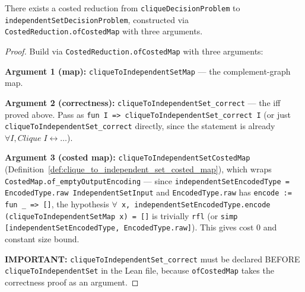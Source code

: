 \begin{theorem}
  \label{thm:clique_to_independent_set}
  There exists a costed reduction from \texttt{cliqueDecisionProblem}
  to \texttt{independentSetDecisionProblem}, constructed via
  \texttt{CostedReduction.ofCostedMap} with three arguments.
\end{theorem}

\begin{proof}
  Build via \texttt{CostedReduction.ofCostedMap} with three arguments:

  \textbf{Argument 1 (map):} \texttt{cliqueToIndependentSetMap} --- the
  complement-graph map.

  \textbf{Argument 2 (correctness):}
  \texttt{cliqueToIndependentSet\_correct} --- the iff proved above.
  Pass as \texttt{fun I => cliqueToIndependentSet\_correct I} (or just
  \texttt{cliqueToIndependentSet\_correct} directly, since the statement
  is already $\forall I, \textit{Clique}\;I \leftrightarrow \ldots$).

  \textbf{Argument 3 (costed map):}
  \texttt{cliqueToIndependentSetCostedMap}
  (Definition~\ref{def:clique_to_independent_set_costed_map}), which wraps
  \texttt{CostedMap.of\_emptyOutputEncoding} --- since
  \texttt{independentSetEncodedType = EncodedType.raw IndependentSetInput}
  and \texttt{EncodedType.raw} has \texttt{encode := fun \_ => []},
  the hypothesis \texttt{$\forall$ x, independentSetEncodedType.encode
  (cliqueToIndependentSetMap x) = []} is trivially \texttt{rfl} (or
  \texttt{simp [independentSetEncodedType, EncodedType.raw]}).
  This gives cost 0 and constant size bound.

  \textbf{IMPORTANT:} \texttt{cliqueToIndependentSet\_correct} must be
  declared BEFORE \texttt{cliqueToIndependentSet} in the Lean file,
  because \texttt{ofCostedMap} takes the correctness proof as an
  argument.
\end{proof}
